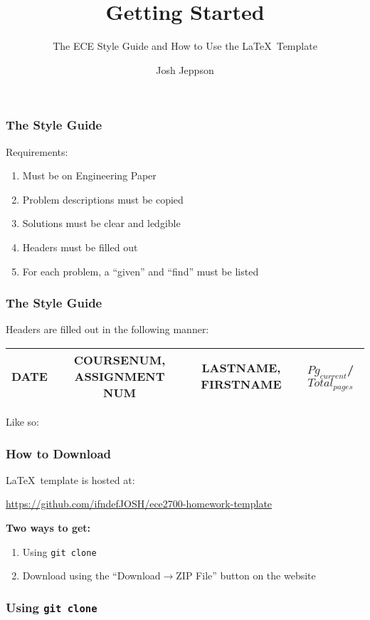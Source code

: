 \documentclass{beamer}
\title{Getting Started}
\subtitle{The ECE Style Guide and How to Use the \LaTeX\ Template}
\author{Josh Jeppson}
\institute{Utah State University}
\begin{document}
\begin{frame}
	\titlepage
\end{frame}

\begin{frame}
	\frametitle{The Style Guide}
	Requirements:
	\begin{enumerate}
		\item Must be on Engineering Paper
		\item Problem descriptions must be copied
		\item Solutions must be clear and ledgible
		\item Headers must be filled out
		\item For each problem, a ``given'' and ``find'' must be listed
	\end{enumerate}

\end{frame}

\begin{frame}
	\frametitle{The Style Guide}
	Headers are filled out in the following manner:
	\begin{center} {\tiny
		\begin{tabular}{|c|c|c|c|} \hline
			DATE & COURSENUM, ASSIGNMENT NUM & LASTNAME, FIRSTNAME & $Pg_{current}$/$Total_{pages}$ \\ \hline
		\end{tabular}
}
	\end{center}
	Like so:

\end{frame}



\begin{frame}
	\frametitle{How to Download}
	\LaTeX\ template is hosted at:
	\begin{center} {\small
		\url{https://github.com/ifndefJOSH/ece2700-homework-template} }
	\end{center}
	\textbf{Two ways to get:}
	\begin{enumerate}
		\item Using \texttt{git clone}
		\item Download using the ``Download$\to$ZIP File'' button on the website
	\end{enumerate}

\end{frame}

\begin{frame}
	\frametitle{Using \texttt{git clone}}
\end{frame}
\end{document}
